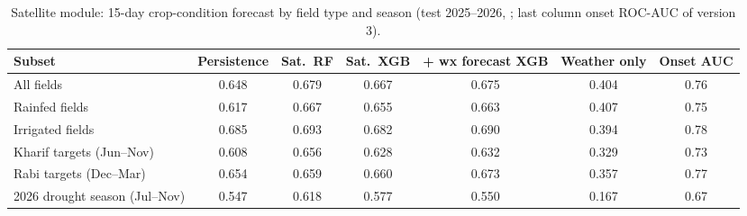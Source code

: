 \begin{table}[H]
\centering
\caption{Satellite module: 15-day crop-condition forecast by field type and season (test 2025--2026, \mf; last column onset ROC-AUC of version 3).}
\label{tab:s_subsets}
\footnotesize
\begin{tabular}{@{}lcccccc@{}}
\toprule
\textbf{Subset} & \textbf{Persistence} & \textbf{Sat.\ RF} & \textbf{Sat.\ XGB} & \textbf{+ wx forecast XGB} & \textbf{Weather only} & \textbf{Onset AUC} \\
\midrule
All fields & 0.648 & 0.679 & 0.667 & 0.675 & 0.404 & 0.76 \\
Rainfed fields & 0.617 & 0.667 & 0.655 & 0.663 & 0.407 & 0.75 \\
Irrigated fields & 0.685 & 0.693 & 0.682 & 0.690 & 0.394 & 0.78 \\
Kharif targets (Jun--Nov) & 0.608 & 0.656 & 0.628 & 0.632 & 0.329 & 0.73 \\
Rabi targets (Dec--Mar) & 0.654 & 0.659 & 0.660 & 0.673 & 0.357 & 0.77 \\
2026 drought season (Jul--Nov) & 0.547 & 0.618 & 0.577 & 0.550 & 0.167 & 0.67 \\
\bottomrule
\end{tabular}
\end{table}
